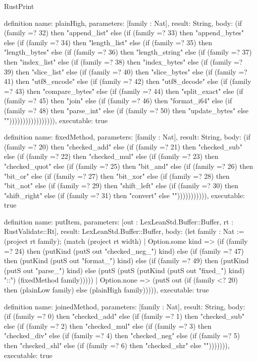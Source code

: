 \begin{lexlean}{RustPrint}
\begin{semanticmodule}
definition{
  name: plainHigh,
  parameters: [family : Nat],
  result: String,
  body: (if (family =? 32) then "append_list" else (if (family =? 33) then "append_bytes" else (if (family =? 34) then "length_list" else (if (family =? 35) then "length_bytes" else (if (family =? 36) then "length_string" else (if (family =? 37) then "index_list" else (if (family =? 38) then "index_bytes" else (if (family =? 39) then "slice_list" else (if (family =? 40) then "slice_bytes" else (if (family =? 41) then "utf8_encode" else (if (family =? 42) then "utf8_decode" else (if (family =? 43) then "compare_bytes" else (if (family =? 44) then "split_exact" else (if (family =? 45) then "join" else (if (family =? 46) then "format_i64" else (if (family =? 48) then "parse_int" else (if (family =? 50) then "update_bytes" else ""))))))))))))))))),
  executable: true
}

definition{
  name: fixedMethod,
  parameters: [family : Nat],
  result: String,
  body: (if (family =? 20) then "checked_add" else (if (family =? 21) then "checked_sub" else (if (family =? 22) then "checked_mul" else (if (family =? 23) then "checked_quot" else (if (family =? 25) then "bit_and" else (if (family =? 26) then "bit_or" else (if (family =? 27) then "bit_xor" else (if (family =? 28) then "bit_not" else (if (family =? 29) then "shift_left" else (if (family =? 30) then "shift_right" else (if (family =? 31) then "convert" else ""))))))))))),
  executable: true
}

definition{
  name: putItem,
  parameters: [out : LexLeanStd.Buffer::Buffer, rt : RustValidate::Rt],
  result: LexLeanStd.Buffer::Buffer,
  body: (let family : Nat := (project rt family); (match (project rt width)
    | Option.some kind => (if (family =? 24) then (putKind (putS out "checked_neg_") kind) else (if (family =? 47) then (putKind (putS out "format_") kind) else (if (family =? 49) then (putKind (putS out "parse_") kind) else (putS (putS (putKind (putS out "fixed_") kind) "::") (fixedMethod family)))))
    | Option.none => (putS out (if (family <? 20) then (plainLow family) else (plainHigh family))))),
  executable: true
}

definition{
  name: joinedMethod,
  parameters: [family : Nat],
  result: String,
  body: (if (family =? 0) then "checked_add" else (if (family =? 1) then "checked_sub" else (if (family =? 2) then "checked_mul" else (if (family =? 3) then "checked_div" else (if (family =? 4) then "checked_neg" else (if (family =? 5) then "checked_shl" else (if (family =? 6) then "checked_shr" else ""))))))),
  executable: true
}


\end{semanticmodule}
\end{lexlean}

